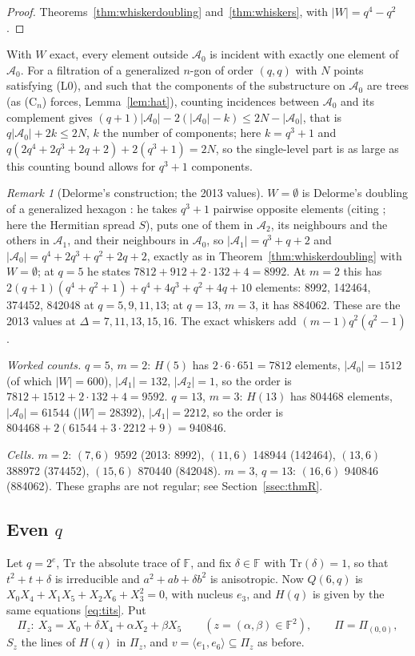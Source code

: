 \documentclass[11pt]{amsart}
\theoremstyle{definition}
\theoremstyle{remark}
\newtheorem{remark}[theorem]{Remark}
\numberwithin{equation}{section}
\newcommand{\F}{\mathbb F}
\newcommand{\Tr}{\mathrm{Tr}}
\newcommand{\cA}{\mathcal A}
\begin{document}
\begin{proof}
Theorems~\ref{thm:whiskerdoubling} and~\ref{thm:whiskers}, with $|W|=q^4-q^2$.
\end{proof}

With $W$ exact, every element outside $\cA_0$ is incident with exactly one element of $\cA_0$. For a filtration of a
generalized $n$-gon of order $(q,q)$ with $N$ points satisfying (L0), and such that the components of the substructure on
$\cA_0$ are trees (as (C$_n$) forces, Lemma~\ref{lem:hat}), counting incidences between $\cA_0$ and its complement gives
$(q+1)|\cA_0|-2(|\cA_0|-k)\le2N-|\cA_0|$, that is $q|\cA_0|+2k\le2N$, $k$ the number of components; here $k=q^3+1$ and $q(2q^4+2q^3+2q+2)+2(q^3+1)=2N$, so the single-level part is as large as this
counting bound allows for $q^3+1$ components.

\begin{remark}[Delorme's construction; the 2013 values]\label{rem:delorme6}
$W=\emptyset$ is Delorme's doubling of a generalized hexagon \cite[\S8(b)]{D85a}: he takes $q^3+1$ pairwise opposite
elements (citing \cite{T80}; here the Hermitian spread $S$), puts one of them in $\cA_2$, its neighbours and the others in
$\cA_1$, and their neighbours in $\cA_0$, so $|\cA_1|=q^3+q+2$ and $|\cA_0|=q^4+2q^3+q^2+2q+2$, exactly as in
Theorem~\ref{thm:whiskerdoubling} with $W=\emptyset$; at $q=5$ he states $7812+912+2\cdot132+4=8992$. At $m=2$ this has
$2(q+1)(q^4+q^2+1)+q^4+4q^3+q^2+4q+10$ elements: 8992, 142464, 374452, 842048 at $q=5,9,11,13$; at $q=13$, $m=3$, it has
884062. These are the 2013 values at $\Delta=7,11,13,15,16$. The exact whiskers add $(m-1)q^2(q^2-1)$.
\end{remark}

\emph{Worked counts.} $q=5$, $m=2$: $H(5)$ has $2\cdot6\cdot651=7812$ elements, $|\cA_0|=1512$ (of which $|W|=600$),
$|\cA_1|=132$, $|\cA_2|=1$, so the order is $7812+1512+2\cdot132+4=9592$. $q=13$, $m=3$: $H(13)$ has 804468 elements,
$|\cA_0|=61544$ ($|W|=28392$), $|\cA_1|=2212$, so the order is $804468+2(61544+3\cdot2212+9)=940846$.

\noindent\emph{Cells.} $m=2$: $(7,6)$ 9592 (2013: 8992), $(11,6)$ 148944 (142464), $(13,6)$ 388972 (374452), $(15,6)$ 870440
(842048). $m=3$, $q=13$: $(16,6)$ 940846 (884062). These graphs are not regular; see Section~\ref{ssec:thmR}.

\subsection{Even $q$}\label{ssec:evenq}
Let $q=2^e$, $\Tr$ the absolute trace of $\F$, and fix $\delta\in\F$ with $\Tr(\delta)=1$, so that $t^2+t+\delta$ is
irreducible and $a^2+ab+\delta b^2$ is anisotropic. Now $Q(6,q)$ is $X_0X_4+X_1X_5+X_2X_6+X_3^2=0$, with nucleus $e_3$,
and $H(q)$ is given by the same equations \eqref{eq:tits}. Put
\[
\Pi_z:\ X_3=X_0+\delta X_4+\alpha X_2+\beta X_5\qquad(z=(\alpha,\beta)\in\F^2),\qquad \Pi=\Pi_{(0,0)},
\]
$S_z$ the lines of $H(q)$ in $\Pi_z$, and $v=\langle e_1,e_6\rangle\subseteq\Pi_z$ as before.
\end{document}
